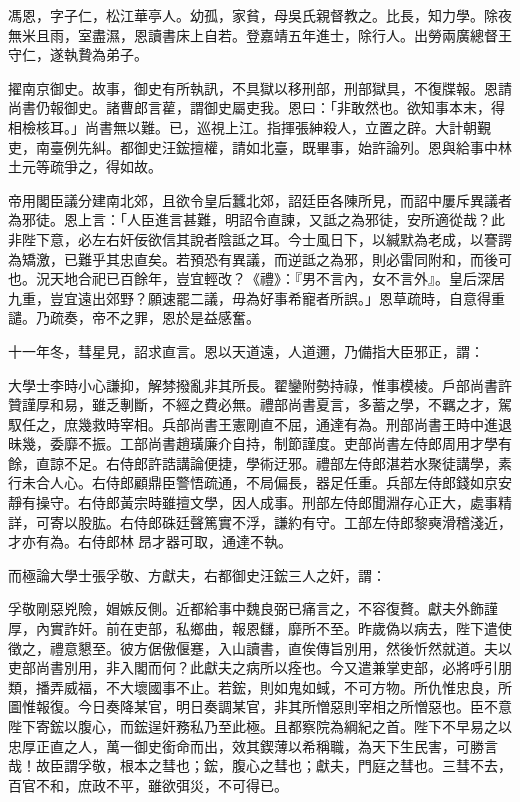 \begin{pinyinscope}
{{馮恩，字子仁，松江華亭人。幼孤，家貧，母吳氏親督教之。比長，知力學。除夜無米且雨，室盡濕，恩讀書床上自若。登嘉靖五年進士，除行人。出勞兩廣總督王守仁，遂執贄為弟子。

擢南京御史。故事，御史有所執訊，不具獄以移刑部，刑部獄具，不復牒報。恩請尚書仍報御史。諸曹郎言雚，謂御史屬吏我。恩曰：「非敢然也。欲知事本末，得相檢核耳。」尚書無以難。已，巡視上江。指揮張紳殺人，立置之辟。大計朝覲吏，南臺例先糾。都御史汪鋐擅權，請如北臺，既畢事，始許論列。恩與給事中林土元等疏爭之，得如故。

帝用閣臣議分建南北郊，且欲令皇后蠶北郊，詔廷臣各陳所見，而詔中屢斥異議者為邪徒。恩上言：「人臣進言甚難，明詔令直諫，又詆之為邪徒，安所適從哉？此非陛下意，必左右奸佞欲信其說者陰詆之耳。今士風日下，以緘默為老成，以謇諤為矯激，已難乎其忠直矣。若預恐有異議，而逆詆之為邪，則必雷同附和，而後可也。況天地合祀已百餘年，豈宜輕改？《禮》：『男不言內，女不言外』。皇后深居九重，豈宜遠出郊野？願速罷二議，毋為好事希寵者所誤。」恩草疏時，自意得重譴。乃疏奏，帝不之罪，恩於是益感奮。

十一年冬，彗星見，詔求直言。恩以天道遠，人道邇，乃備指大臣邪正，謂：

大學士李時小心謙抑，解棼撥亂非其所長。翟鑾附勢持祿，惟事模棱。戶部尚書許贊謹厚和易，雖乏剸斷，不經之費必無。禮部尚書夏言，多蓄之學，不羈之才，駕馭任之，庶幾救時宰相。兵部尚書王憲剛直不屈，通達有為。刑部尚書王時中進退昧幾，委靡不振。工部尚書趙璜廉介自持，制節謹度。吏部尚書左侍郎周用才學有餘，直諒不足。右侍郎許誥講論便捷，學術迂邪。禮部左侍郎湛若水聚徒講學，素行未合人心。右侍郎顧鼎臣警悟疏通，不局偏長，器足任重。兵部左侍郎錢如京安靜有操守。右侍郎黃宗時雖擅文學，因人成事。刑部左侍郎聞淵存心正大，處事精詳，可寄以股肱。右侍郎硃廷聲篤實不浮，謙約有守。工部左侍郎黎奭滑稽淺近，才亦有為。右侍郎林昂才器可取，通達不執。

而極論大學士張孚敬、方獻夫，右都御史汪鋐三人之奸，謂：

孚敬剛惡兇險，媢嫉反側。近都給事中魏良弼已痛言之，不容復贅。獻夫外飾謹厚，內實詐奸。前在吏部，私鄉曲，報恩讎，靡所不至。昨歲偽以病去，陛下遣使徵之，禮意懇至。彼方倨傲偃蹇，入山讀書，直俟傳旨別用，然後忻然就道。夫以吏部尚書別用，非入閣而何？此獻夫之病所以痊也。今又遣兼掌吏部，必將呼引朋類，播弄威福，不大壞國事不止。若鋐，則如鬼如蜮，不可方物。所仇惟忠良，所圖惟報復。今日奏降某官，明日奏調某官，非其所憎惡則宰相之所憎惡也。臣不意陛下寄鋐以腹心，而鋐逞奸務私乃至此極。且都察院為綱紀之首。陛下不早易之以忠厚正直之人，萬一御史銜命而出，效其鍥薄以希稱職，為天下生民害，可勝言哉！故臣謂孚敬，根本之彗也；鋐，腹心之彗也；獻夫，門庭之彗也。三彗不去，百官不和，庶政不平，雖欲弭災，不可得已。

}}
\end{pinyinscope}
